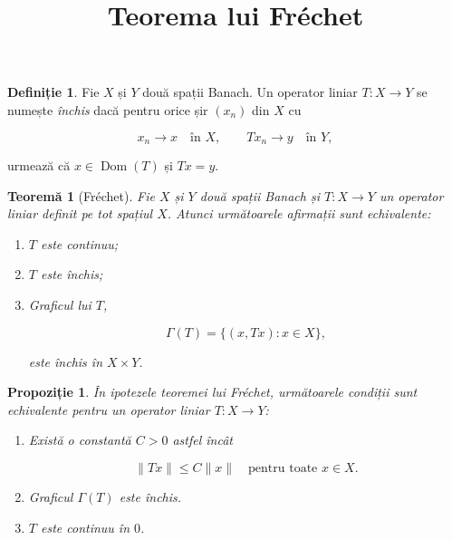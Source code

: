 \documentclass[12pt]{article}
\title{Teorema lui Fréchet}
\author{}
\date{}
\theoremstyle{definition}
\newtheorem{definition}{Definiție}
\theoremstyle{plain}
\newtheorem{theorem}{Teoremă}
\newtheorem{proposition}{Propoziție}
\begin{document}
\maketitle

\begin{definition}
Fie $X$ și $Y$ două spații Banach. Un operator liniar $T : X \to Y$ se numește \emph{închis} dacă pentru orice șir $(x_n)$ din $X$ cu


\[
x_n \to x \quad \text{în } X, \qquad Tx_n \to y \quad \text{în } Y,
\]


urmează că $x \in \operatorname{Dom}(T)$ și $Tx = y$.
\end{definition}

\begin{theorem}[Fréchet]
Fie $X$ și $Y$ două spații Banach și $T : X \to Y$ un operator liniar definit pe tot spațiul $X$. Atunci următoarele afirmații sunt echivalente:
\begin{enumerate}
    \item[(i)] $T$ este continuu;
    \item[(ii)] $T$ este închis;
    \item[(iii)] Graficul lui $T$,
    

\[
    \Gamma(T) = \{(x,Tx) : x \in X\},
    \]


    este închis în $X \times Y$.
\end{enumerate}
\end{theorem}

\begin{proposition}
În ipotezele teoremei lui Fréchet, următoarele condiții sunt echivalente pentru un operator liniar $T : X \to Y$:
\begin{enumerate}
    \item[(i)] Există o constantă $C > 0$ astfel încât
    

\[
    \|Tx\| \le C \|x\| \quad \text{pentru toate } x \in X.
    \]


    \item[(ii)] Graficul $\Gamma(T)$ este închis.
    \item[(iii)] $T$ este continuu în $0$.
\end{enumerate}
\end{proposition}
\end{document}

